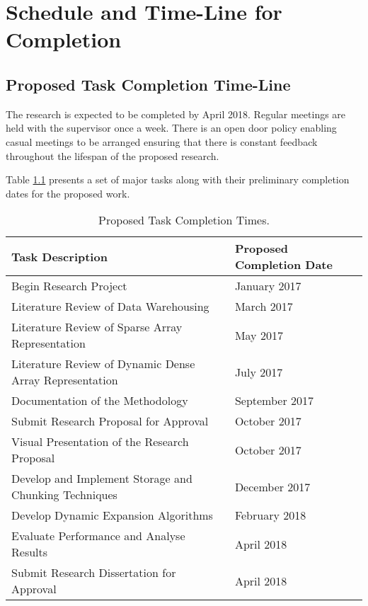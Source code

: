 %
%
%
%
%
\chapter{Schedule and Time-Line for Completion} \label{chap:schedule}
\vspace{-1cm}

\section{Proposed Task Completion Time-Line}
The research is expected to be completed by April 2018. Regular meetings are held with the supervisor once a week. There is an open door policy enabling casual meetings to be arranged  ensuring that there is constant feedback throughout the lifespan of the proposed research. 

Table \ref{tab:timeline} presents a set of major tasks along with their preliminary completion dates for the proposed work.

\begin{table}
	\caption{Proposed Task Completion Times.\label{tab:timeline}}
	\begin{center}
		\begin{tabular}{|l|l|}
		\hline 
		\textbf{Task Description} & \textbf{Proposed Completion Date} \\ 
		\hline 
	 	Begin Research Project & January 2017\\
	 	Literature Review of Data Warehousing & March 2017\\
	 	Literature Review of Sparse Array Representation & May 2017\\
	 	Literature Review of Dynamic Dense Array Representation & July 2017\\
	 	Documentation of the Methodology & September 2017\\
	 	Submit Research Proposal for Approval & October 2017\\
	 	Visual Presentation of the Research Proposal & October 2017 \\
	 	Develop and Implement Storage and Chunking Techniques & December 2017\\
	 	Develop Dynamic Expansion Algorithms & February 2018\\
		Evaluate Performance and Analyse Results & April 2018\\
		Submit Research Dissertation for Approval & April 2018\\
		\hline 
		\end{tabular} 
	\end{center}
\end{table}